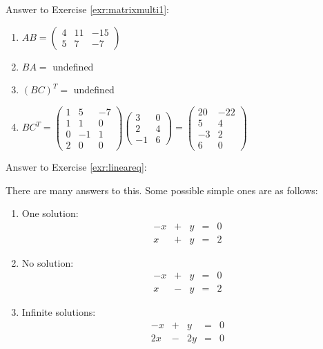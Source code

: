 \documentclass[]{book}
\theoremstyle{definition}
\theoremstyle{definition}
\theoremstyle{definition}
\theoremstyle{remark}
\begin{document}
Answer to Exercise \ref{exr:matrixmulti1}:

\begin{enumerate}
\def\labelenumi{\arabic{enumi}.}
\item
  \(AB = \begin{pmatrix} 4 & 11 & -15 \\ 5 & 7 & -7 \end{pmatrix}\)
\item
  \(BA =\) undefined
\item
  \((BC)^T =\) undefined
\item
  \(BC^T = \begin{pmatrix} 1&5&-7\\1&1&0\\0&-1&1\\2&0&0\end{pmatrix}\begin{pmatrix} 3&0\\2&4\\-1&6 \end{pmatrix} =\begin{pmatrix}20 & -22 \\ 5 & 4 \\ -3 &2 \\6 & 0\end{pmatrix}\)
\end{enumerate}

Answer to Exercise \ref{exr:lineareq}:

There are many answers to this. Some possible simple ones are as follows:

\begin{enumerate}
\def\labelenumi{\arabic{enumi}.}
\item
  One solution: \[\begin{matrix}
           -x  & + & y & = & 0\\
           x & + &  y & = &  2
           \end{matrix}\]
\item
  No solution: \[\begin{matrix}
          -x  & + & y & = & 0\\
          x & - &  y & = &  2
          \end{matrix}\]
\item
  Infinite solutions: \[\begin{matrix}
           -x  & + & y & = & 0\\
           2x & - &  2y & = &  0
           \end{matrix}\]
\end{enumerate}
\end{document}
